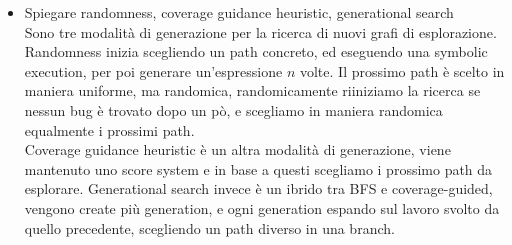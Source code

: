 \documentclass[11pt, oneside]{article}   	%
\begin{document}
\begin{itemize}
\item Spiegare randomness, coverage guidance heuristic, generational search\\
Sono tre modalità di generazione per la ricerca di nuovi grafi di esplorazione. \\
Randomness inizia scegliendo un path concreto, ed eseguendo una symbolic execution, per poi generare un'espressione $n$ volte. Il prossimo path è scelto in maniera uniforme, ma randomica, randomicamente riiniziamo la ricerca se nessun bug è trovato dopo un pò, e scegliamo in maniera randomica equalmente i prossimi path. \\
Coverage guidance heuristic è un altra modalità di generazione, viene mantenuto uno score system e in base a questi scegliamo i prossimo path da esplorare. Generational search invece è un ibrido tra BFS e coverage-guided, vengono create più generation, e ogni generation espando sul lavoro svolto da quello precedente, scegliendo un path diverso in una branch.
\end{itemize}
\end{document}
